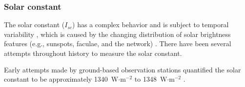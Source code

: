 \subsubsection{Solar constant}
\label{sec:gsc}
The solar constant ($I_{sc}$) has a complex behavior and is subject to temporal variability \parencite{crommelynck97}, which is caused by the changing distribution of solar brightness features (e.g., sunspots, faculae, and the network) \parencite{krivova10}. 
There have been several attempts throughout history to measure the solar constant. 

Early attempts made by ground-based observation stations quantified the solar constant to be approximately 1340~W$\cdot$m$^{-2}$ \parencite{abbot11} to 1348~W$\cdot$m$^{-2}$ \parencite{abbot14}.

